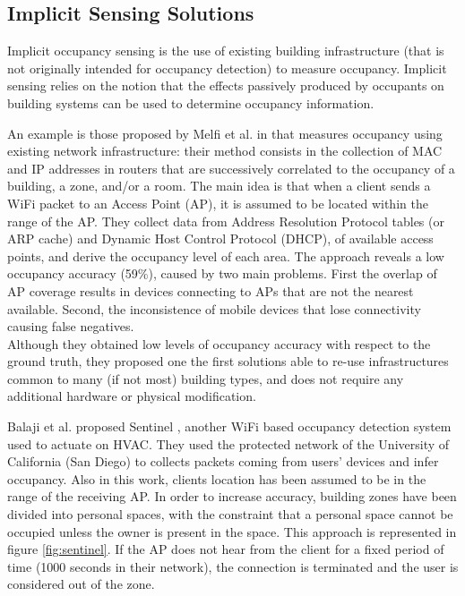 
\subsection{Implicit Sensing Solutions}
\label{subsec:implicit}
Implicit occupancy sensing is the use of existing building infrastructure (that is not originally intended for occupancy detection) to measure occupancy. Implicit sensing relies on the notion that the effects passively produced by occupants on building systems can be used to determine occupancy information.

\smallskip
An example is those proposed by Melfi et al. in \cite{Melfi2011} that measures occupancy using existing network infrastructure: their method consists in the collection of MAC and IP addresses in routers that are successively correlated to the occupancy of a building, a zone, and/or a room. The main idea is that when a client sends a WiFi packet to an Access Point (AP), it is assumed to be located within the range of the AP.
They collect data from Address Resolution Protocol tables (or ARP cache) and Dynamic Host Control Protocol (DHCP), of available access points, and derive the occupancy level of each area.
The approach reveals a low occupancy accuracy (59\%), caused by two main problems. First the overlap of AP coverage results in devices connecting to APs that are not the nearest available. Second, the inconsistence of mobile devices that lose connectivity causing false negatives.\\
Although they obtained low levels of occupancy accuracy with respect to the ground truth, they proposed one the first solutions able to re-use infrastructures common to many (if not most) building types, and does not require any additional hardware or physical modification.

\smallskip
Balaji et al. proposed Sentinel \cite{Balaji2013}, another WiFi based occupancy detection system used to actuate on HVAC. They used the protected network of the University of California (San Diego) to collects packets coming from users' devices and infer occupancy. Also in this work, clients location has been assumed to be in the range of the receiving AP. In order to increase accuracy, building zones have been divided into personal spaces, with the constraint that a personal space cannot be occupied unless the owner is present in the space. This approach is represented in figure \ref{fig:sentinel}. If the AP does not hear from the client for a fixed period of time (1000 seconds in their network), the connection is terminated and the user is considered out of the zone.

